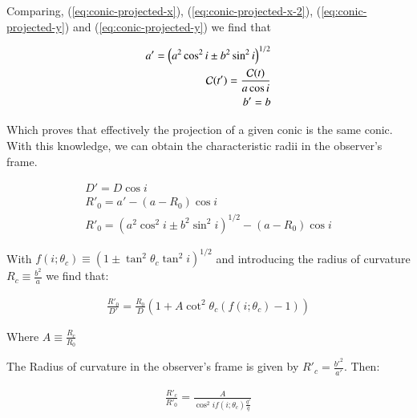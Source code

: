 Comparing, (\ref{eq:conic-projected-x}), (\ref{eq:conic-projected-x-2}), (\ref{eq:conic-projected-y}) and (\ref{eq:conic-projected-y}) we find that

\begin{align}
a' = \left(a^2\cos^2 i \pm b^2\sin^2 i\right)^{1/2} \\
\mathcal{C}(t') = \frac{\mathcal{C}(t)}{a\cos i} \\
b' = b
\end{align} 

Which proves that effectively the projection of a given conic is the same conic. With this knowledge, we can obtain the characteristic radii in
the observer's frame.

\begin{align}
D' = D\cos i \\
R'_0 = a' - (a-R_0)\cos i \\
R'_0 = \left(a^2\cos^2 i \pm b^2\sin^2 i\right)^{1/2}  - (a-R_0)\cos i
\end{align}

With  $f(i;\theta_c)\equiv\left(1\pm\tan^2\theta_c\tan^2i\right)^{1/2}$ and introducing the
radius of curvature $R_c\equiv \frac{b^2}{a}$ we find that:

\begin{align}
\frac{R'_0}{D'}=\frac{R_0}{D}\left(1+A\cot^2\theta_c(f(i;\theta_c)-1) \right)
\end{align}

Where $A\equiv \frac{R_c}{R_0}$

The Radius of curvature in the observer's frame is given by $R'_c=\frac{b'^2}{a'}$. Then:

\begin{align}
\frac{R'_c}{R'_0} = \frac{A}{\cos^2 i f(i;\theta_c)\frac{q'}{q}}
\end{align}

